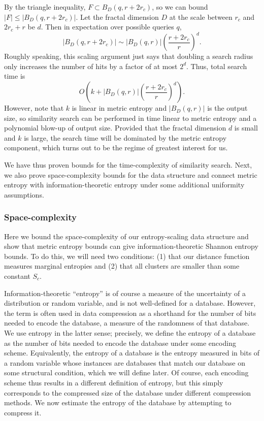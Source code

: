 \documentclass[review,preprint,12pt]{elsarticle}
\theoremstyle{definition}
\theoremstyle{remark}
\begin{document}
By the triangle inequality, $F \subset B_D(q,r+2r_c)$,
so we can bound $|F| \le |B_D(q,r+2r_c)|$.
Let the fractal dimension $D$ at the scale between $r_c$ and $2r_c + r$ be $d$.
Then in expectation over possible queries $q$,
\[
    \left|B_D(q, r+2r_c)\right| \sim \left|B_D(q,r)\right|\left(\frac{r+2r_c}{r}\right)^d .
\]
Roughly speaking, this scaling argument just says that doubling a search radius only increases the number of hits by a factor of at most $2^d$.
Thus, total search time is 
\[
    O\left(k + \left|B_D(q,r)\right|\left(\frac{r+2r_c}{r}\right)^d \right).
\]
However, note that $k$ is linear in metric entropy and $|B_D(q,r)|$ is the output size, so similarity search can be performed in time linear to metric entropy and a polynomial blow-up of output size.
Provided that the fractal dimension $d$ is small and $k$ is large, the search time will be dominated by the metric entropy component, which turns out to be the regime of greatest interest for us.

We have thus proven bounds for the time-complexity of similarity search.
Next, we also prove space-complexity bounds for the data structure and connect metric entropy with information-theoretic entropy under some additional uniformity assumptions.

\subsubsection{Space-complexity}
Here we bound the space-complexity of our entropy-scaling data structure and show that metric entropy bounds can give information-theoretic Shannon entropy bounds.
To do this, we will need two conditions: (1) that our distance function measures marginal entropies and (2) that all clusters are smaller than some constant $S_c$.

Information-theoretic ``entropy'' is of course a measure of the uncertainty of a distribution or random variable, and is not well-defined for a database.
However, the term is often used in data compression as a shorthand for the number of bits needed to encode the database, a measure of the randomness of that database.
We use entropy in the latter sense; precisely, we define the entropy of a database as the number of bits needed to encode the database under some encoding scheme.
Equivalently, the entropy of a database is the entropy measured in bits of a random variable whose instances are databases that match our database on some structural condition, which we will define later.
Of course, each encoding scheme thus results in a different definition of entropy, but this simply corresponds to the compressed size of the database under different compression methods.
We now estimate the entropy of the database by attempting to compress it.
\end{document}
